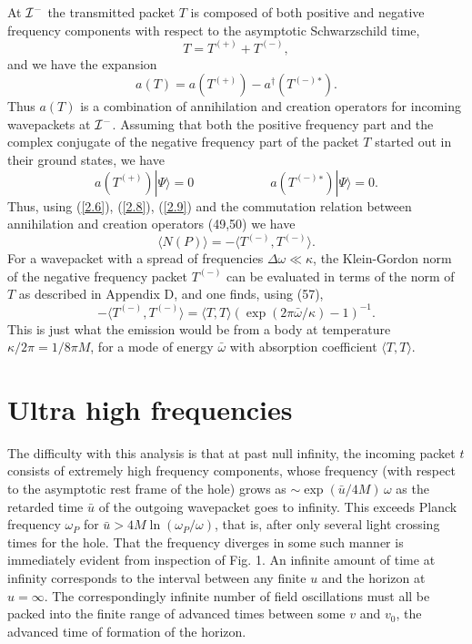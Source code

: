 \documentclass[12pt]{article}
\def\o{\omega}
\def\obar{\bar{\omega}}
\def\ubar{\bar{u}}
\def\la{\langle}
\def\ra{\rangle}
\def\pastI{{\cal I}^-}
\begin{document}
At $\pastI$ the transmitted packet $T$ is composed of both
positive and negative frequency components with respect to the
asymptotic Schwarzschild time,
\begin{equation}
T=T^{\scriptscriptstyle (+)}+T^{\scriptscriptstyle (-)},
\end{equation}
and we have the expansion
\begin{equation} a(T)=a(T^{\scriptscriptstyle (+)})-
a^{\dagger}(T^{\scriptscriptstyle (-)}{}^*).
\label{2.8}
\end{equation}
Thus $a(T)$ is a combination of annihilation and creation
operators for incoming wavepackets at $\pastI$.
Assuming that both the positive frequency part and the complex
conjugate of the negative frequency part of the packet $T$
started out in their ground states, we have
\begin{equation}
a(T^{\scriptscriptstyle (+)})|\Psi\ra=0\qquad\qquad\qquad
a(T^{\scriptscriptstyle (-)}{}^*)|\Psi\ra=0.
\label{2.9}
\end{equation}
Thus, using (\ref{2.6}), (\ref{2.8}), (\ref{2.9}) and the
commutation relation between
annihilation and creation operators (49,50) we have
\begin{equation} \la N(P)\ra =
-\la T^{\scriptscriptstyle (-)},T^{\scriptscriptstyle (-)}\ra.
\end{equation}
For a wavepacket with a spread of frequencies
$\Delta\o\ll\kappa$, the Klein-Gordon norm of the negative frequency
packet $T^{\scriptscriptstyle (-)}$ can be evaluated in terms of
the norm of $T$ as described in Appendix D, and one finds,
using (57),
\begin{equation}
-\la T^{\scriptscriptstyle (-)},T^{\scriptscriptstyle (-)}\ra
=\la T,T\ra (\exp(2\pi\obar/\kappa)-1)^{-1}.
\label{2.11}
\end{equation}
This is just what the emission would be from a body at
temperature $\kappa/2\pi=1/8\pi M$, for a mode of energy $\obar$
with absorption coefficient $\la T,T\ra$.
\section{Ultra high frequencies}
\label{sec:3}

The difficulty with this analysis is that at past null infinity,
the incoming packet $t$ consists of extremely high frequency
components, whose frequency (with respect to the asymptotic rest
frame of the hole) grows as $\sim\exp(\ubar/4M)\, \o$ as the
retarded time $\ubar$ of the outgoing wavepacket goes to
infinity. This exceeds Planck frequency $\o_P$ for $\ubar>4M
\ln(\o_P/\o)$, that is, after only several light
crossing times for the hole. That the frequency diverges in
some such manner is immediately evident from inspection of
Fig. 1. An infinite amount of time at infinity corresponds
to the interval between any finite $u$ and the horizon at
$u=\infty$. The correspondingly infinite number of field
oscillations must all be packed into the finite range of
advanced times between some $v$ and $v_0$, the advanced time of
formation of the horizon.
\end{document}
